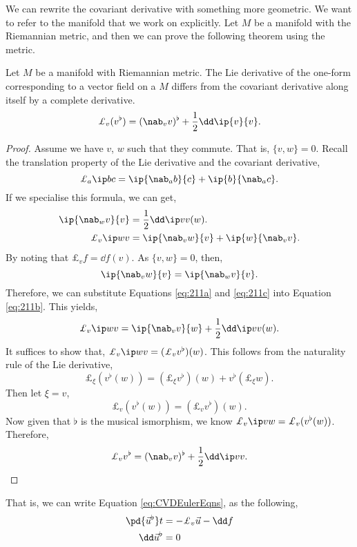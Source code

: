 \noindent
We can rewrite the covariant derivative with something more geometric. We want to refer to the manifold that we work on explicitly. Let $M$ be a manifold with the Riemannian metric, and then we can prove the following theorem using the metric.
\begin{nthm}
  Let $M$ be a manifold with Riemannian metric. The Lie derivative of the one-form corresponding to a vector field on a $M$ differs from the covariant derivative along itself by a complete derivative.
  $$ \pounds_v (v^\flat) = (\nab_vv)^\flat + \frac{1}{2}\dd \ip{v}{v}. $$
\end{nthm}
\begin{proof}
  Assume we have $v$, $w$ such that they commute. That is, $\{v, w\} = 0$. Recall the translation property of the Lie derivative and the covariant derivative,
  $$ \pounds_a \ip b c = \ip{\nab_a b}{c} + \ip{b}{\nab_a c}. $$
  If we specialise this formula, we can get,
  \begin{align}
    \ip{\nab_w v}{v} &= \frac{1}{2}\dd\ip v v (w). \label{eq:211a}\\
    \pounds_v \ip w v &= \ip{\nab_v w}{v} + \ip{w}{\nab_v v}.\label{eq:211b}
  \end{align}
  By noting that $\pounds_v f = \dd f(v)$. As $\{v, w\} = 0$, then,
  \begin{equation}
    \ip{\nab_v w}{v} = \ip{\nab_w v}{v}.\label{eq:211c}
  \end{equation}
  Therefore, we can substitute Equations \ref{eq:211a} and \ref{eq:211c} into Equation \ref{eq:211b}. This yields,
  $$ \pounds_v \ip w v = \ip{\nab_v v}{w} + \frac{1}{2}\dd \ip v v (w). $$
  It suffices to show that, $\pounds_v \ip w v = (\pounds_v v^\flat) (w)$. This follows from the naturality rule of the Lie derivative,
  $$ \pounds_\xi (v^\flat (w)) = (\pounds_\xi v^\flat) (w) + v^\flat (\pounds_\xi w). $$
  Then let $\xi = v$,
  $$ \pounds_v (v^\flat(w)) = (\pounds_v v^\flat)(w). $$
  Now given that $\flat$ is the musical ismorphism, we know $\pounds_v \ip v w = \pounds_v (v^\flat(w))$. Therefore,
  $$ \pounds_v v^\flat = (\nab_v v)^\flat + \frac{1}{2}\dd \ip v v. $$
\end{proof}

\noindent
That is, we can write Equation \ref{eq:CVDEulerEqns}, as the following,
\begin{equation}
  \begin{split}
    \pd {\vec u^\flat} t &= -\pounds_v \vec u - \dd f \\
    \dd \vec u^\flat &= 0
  \end{split}
\end{equation}

